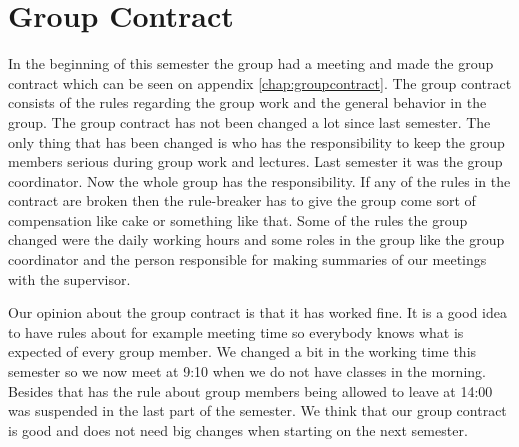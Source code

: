 \section{Group Contract}
In the beginning of this semester the group had a meeting and made the group contract which can be seen on appendix \ref{chap:groupcontract}. The group contract consists of the rules regarding the group work and the general behavior in the group. The group contract has not been changed a lot since last semester. The only thing that has been changed is who has the responsibility to keep the group members serious during group work and lectures. Last semester it was the group coordinator. Now the whole group has the responsibility. If any of the rules in the contract are broken then the rule-breaker has to give the group come sort of compensation like cake or something like that. Some of the rules the group changed were the daily working hours and some roles in the group like the group coordinator and the person responsible for making summaries of our meetings with the supervisor. 

Our opinion about the group contract is that it has worked fine. It is a good idea to have rules about for example meeting time so everybody knows what is expected of every group member. We changed a bit in the working time this semester so we now meet at 9:10 when we do not have classes in the morning. Besides that has the rule about group members being allowed to leave at 14:00 was suspended in the last part of the semester. We think that our group contract is good and does not need big changes when starting on the next semester.